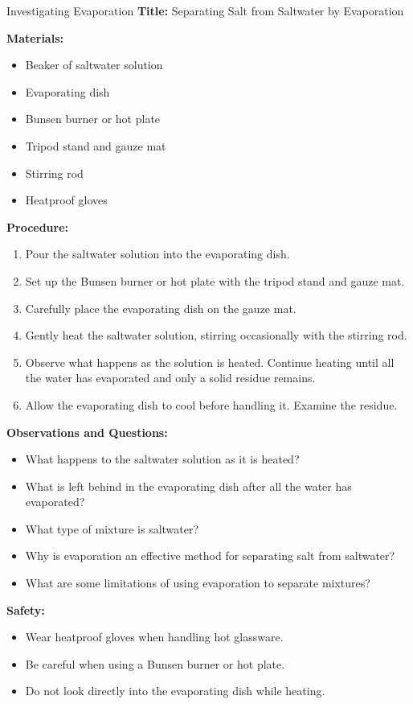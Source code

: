 \begin{investigation}{Investigating Evaporation}
\textbf{Title:} Separating Salt from Saltwater by Evaporation

\textbf{Materials:}
\begin{itemize}
    \item Beaker of saltwater solution
    \item Evaporating dish
    \item Bunsen burner or hot plate
    \item Tripod stand and gauze mat
    \item Stirring rod
    \item Heatproof gloves
\end{itemize}

\textbf{Procedure:}
\begin{enumerate}
    \item Pour the saltwater solution into the evaporating dish.
    \item Set up the Bunsen burner or hot plate with the tripod stand and gauze mat.
    \item Carefully place the evaporating dish on the gauze mat.
    \item Gently heat the saltwater solution, stirring occasionally with the stirring rod.
    \item Observe what happens as the solution is heated. Continue heating until all the water has evaporated and only a solid residue remains.
    \item Allow the evaporating dish to cool before handling it. Examine the residue.
\end{enumerate}

\textbf{Observations and Questions:}
\begin{itemize}
    \item What happens to the saltwater solution as it is heated?
    \item What is left behind in the evaporating dish after all the water has evaporated?
    \item What type of mixture is saltwater?
    \item Why is evaporation an effective method for separating salt from saltwater?
    \item What are some limitations of using evaporation to separate mixtures?
\end{itemize}

\textbf{Safety:}
\begin{itemize}
    \item Wear heatproof gloves when handling hot glassware.
    \item Be careful when using a Bunsen burner or hot plate.
    \item Do not look directly into the evaporating dish while heating.
\end{itemize}
\end{investigation}

